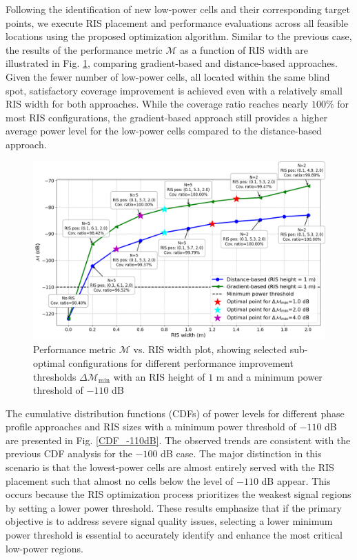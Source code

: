 \documentclass{IEEEoj}
\begin{document}
Following the identification of new low-power cells and their corresponding target points, we execute RIS placement and performance evaluations across all feasible locations using the proposed optimization algorithm. Similar to the previous case, the results of the performance metric $\mathcal{M}$ as a function of RIS width are illustrated in Fig. \ref{perf_metric_RIS_width_-110dB_multiple_curves_height_1m}, comparing gradient-based and distance-based approaches. Given the fewer number of low-power cells, all located within the same blind spot, satisfactory coverage improvement is achieved even with a relatively small RIS width for both approaches. While the coverage ratio reaches nearly $100\%$ for most RIS configurations, the gradient-based approach still provides a higher average power level for the low-power cells compared to the distance-based approach.

\begin{figure}
	\centering \includegraphics[width=\linewidth]{Sim_Results/perf_metric_RIS_width_-110dB_multiple_curves_height_1m.png}
	\caption{Performance metric $\mathcal{M}$ vs. RIS width plot, showing selected sub-optimal configurations for different performance improvement thresholds $\Delta \mathcal{M}_{\text{min}}$ with an RIS height of $1$ m and a minimum power threshold of $-110$ dB}
	\label{perf_metric_RIS_width_-110dB_multiple_curves_height_1m}
\end{figure}

The cumulative distribution functions (CDFs) of power levels for different phase profile approaches and RIS sizes with a minimum power threshold of $-110$ dB are presented in Fig. \ref{CDF_-110dB}. The observed trends are consistent with the previous CDF analysis for the $-100$ dB case. The major distinction in this scenario is that the lowest-power cells are almost entirely served with the RIS placement such that almost no cells below the level of $-110$ dB appear. This occurs because the RIS optimization process prioritizes the weakest signal regions by setting a lower power threshold. These results emphasize that if the primary objective is to address severe signal quality issues, selecting a lower minimum power threshold is essential to accurately identify and enhance the most critical low-power regions.
\end{document}
